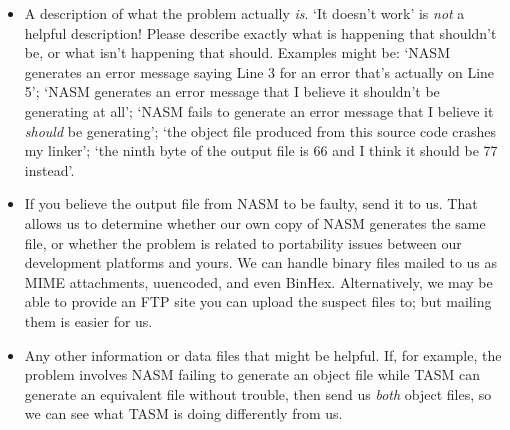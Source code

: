 \begin{itemize}
    \item{A description of what the problem actually \emph{is}. `It doesn't
        work' is \emph{not} a helpful description! Please describe exactly what
        is happening that shouldn't be, or what isn't happening that should.
        Examples might be: `NASM generates an error message saying Line 3
        for an error that's actually on Line 5'; `NASM generates an error
        message that I believe it shouldn't be generating at all'; `NASM
        fails to generate an error message that I believe it \emph{should} be
        generating'; `the object file produced from this source code crashes
        my linker'; `the ninth byte of the output file is 66 and I think it
        should be 77 instead'.}

    \item{If you believe the output file from NASM to be faulty, send it to
        us. That allows us to determine whether our own copy of NASM
        generates the same file, or whether the problem is related to
        portability issues between our development platforms and yours. We
        can handle binary files mailed to us as MIME attachments, uuencoded,
        and even BinHex. Alternatively, we may be able to provide an FTP
        site you can upload the suspect files to; but mailing them is easier
        for us.}

    \item{Any other information or data files that might be helpful. If,
        for example, the problem involves NASM failing to generate an object
        file while TASM can generate an equivalent file without trouble,
        then send us \emph{both} object files, so we can see what TASM is doing
        differently from us.}
\end{itemize}
